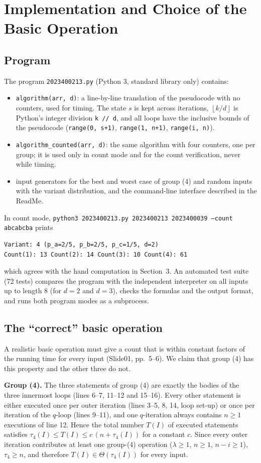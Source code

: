 \documentclass[11pt]{article}
\theoremstyle{remark}
\newcommand{\fl}[1]{\left\lfloor #1\right\rfloor}
\begin{document}
\section{Implementation and Choice of the Basic Operation}
\label{sec:impl}
\subsection{Program}
The program \texttt{2023400213.py} (Python 3, standard library only) contains:
\begin{itemize}[nosep]
\item \texttt{algorithm(arr, d)}: a line-by-line translation of the pseudocode with no counters, used for timing. The
state $s$ is kept across iterations, $\fl{k/d}$ is Python's integer division \texttt{k // d}, and all loops have the
inclusive bounds of the pseudocode (\texttt{range(0, s+1)}, \texttt{range(1, n+1)}, \texttt{range(i, n)}).
\item \texttt{algorithm\_counted(arr, d)}: the same algorithm with four counters, one per group; it is used only in
count mode and for the count verification, never while timing.
\item input generators for the best and worst case of group (4) and random inputs with the variant distribution, and
the command-line interface described in the ReadMe.
\end{itemize}
In count mode, \texttt{python3 2023400213.py 2023400213 2023400039 --count abcabcba} prints
\begin{verbatim}
Variant: 4 (p_a=2/5, p_b=2/5, p_c=1/5, d=2)
Count(1): 13 Count(2): 14 Count(3): 10 Count(4): 61
\end{verbatim}
which agrees with the hand computation in Section~3. An automated test suite (72 tests) compares the program with the
independent interpreter on all inputs up to length 8 (for $d=2$ and $d=3$), checks the formulas and the
output format, and runs both program modes as a subprocess.

\subsection{The ``correct'' basic operation}
\label{sec:basicop}
A realistic basic operation must give a count that is within constant factors of the running time for every input
(Slide01, pp.~5--6). We claim that group (4) has this property and the other three do not.

\textbf{Group (4).} The three statements of group (4) are exactly the bodies of the three innermost loops (lines 6--7,
11--12 and 15--16). Every other statement is either executed once per outer iteration (lines 3--5, 8, 14, loop set-up)
or once per iteration of the $q$-loop (lines 9--11), and one $q$-iteration always contains $n\ge1$ executions of line
12. Hence the total number $T(I)$ of executed statements satisfies $\tau_4(I)\le T(I)\le c\,(n+\tau_4(I))$ for a
constant $c$. Since every outer iteration contributes at least one group-(4) operation ($\lambda\ge1$, $n\ge1$,
$n-i\ge 1$), $\tau_4\ge n$, and therefore $T(I)\in\Theta(\tau_4(I))$ for every input.
\end{document}
